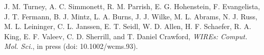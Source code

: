 J. M. Turney, A. C. Simmonett, R. M. Parrish, E. G. Hohenstein,
F. Evangelista, J. T. Fermann, B. J. Mintz, L. A. Burns, J. J. Wilke,
M. L. Abrams, N. J. Russ, M. L. Leininger, C. L. Janssen, E. T. Seidl,
W. D. Allen, H. F. Schaefer, R. A. King, E. F. Valeev, C. D. Sherrill,
and T. Daniel Crawford,
{\em WIREs: Comput. Mol. Sci.}, in press (doi: 10.1002/wcms.93).
